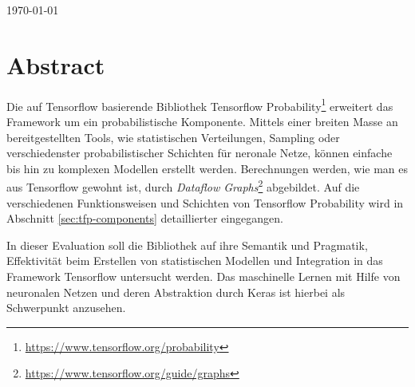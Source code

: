 \documentclass[12pt]{article}
\begin{document}
\begin{titlepage}
\begin{center}

\vspace{\fill} %

{\large \today}\\[3cm] %

\end{center}

\end{titlepage}



\tableofcontents

\newpage

\listoffigures
\listoftables

\newpage


\section{Abstract}
\label{abstract}
Die auf Tensorflow basierende Bibliothek Tensorflow Probability\footnote{\url{https://www.tensorflow.org/probability}} erweitert das Framework um ein probabilistische Komponente.
Mittels einer breiten Masse an bereitgestellten Tools, wie statistischen Verteilungen, Sampling oder verschiedenster probabilistischer Schichten für neronale Netze, können einfache bis hin zu komplexen Modellen erstellt werden. Berechnungen werden, wie man es aus Tensorflow gewohnt ist, durch \textit{Dataflow Graphs}\footnote{\url{https://www.tensorflow.org/guide/graphs}} abgebildet. Auf die verschiedenen Funktionsweisen und Schichten von Tensorflow Probability wird in Abschnitt \ref{sec:tfp-components} detaillierter eingegangen.

In dieser Evaluation soll die Bibliothek auf ihre Semantik und Pragmatik, Effektivität beim Erstellen von statistischen Modellen und Integration in das Framework Tensorflow untersucht werden. Das maschinelle Lernen mit Hilfe von neuronalen Netzen und deren Abstraktion durch Keras ist hierbei als Schwerpunkt anzusehen.
\end{document}
